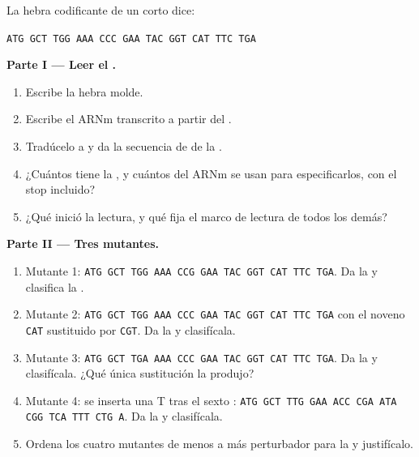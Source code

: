 \begin{problem}
\label{pb:g11:gene-expression:1}
La hebra codificante de un  corto dice:
\begin{center}
\texttt{ATG GCT TGG AAA CCC GAA TAC GGT CAT TTC TGA}
\end{center}

\medskip
\noindent\textbf{Parte I --- Leer el .}
\begin{enumerate}
  \item Escribe la hebra molde.
  \item Escribe el ARNm transcrito a partir del .
  \item Tradúcelo  a  y da la secuencia de  de la
        .
  \item ¿Cuántos  tiene la , y cuántos 
        del ARNm se usan para especificarlos, con el stop incluido?
  \item ¿Qué  inició la lectura, y qué fija el marco de lectura de
        todos los demás?
\end{enumerate}

\medskip
\noindent\textbf{Parte II --- Tres mutantes.}
\begin{enumerate}[resume]
  \item Mutante 1: \texttt{ATG GCT TGG AAA CCG GAA TAC GGT CAT TTC TGA}.
        Da la  y clasifica la .
  \item Mutante 2: \texttt{ATG GCT TGG AAA CCC GAA TAC GGT CAT TTC TGA}
        con el noveno  \texttt{CAT} sustituido por \texttt{CGT}.
        Da la  y clasifícala.
  \item Mutante 3: \texttt{ATG GCT TGA AAA CCC GAA TAC GGT CAT TTC TGA}.
        Da la  y clasifícala. ¿Qué única sustitución la
        produjo?
  \item Mutante 4: se inserta una T tras el sexto :
        \texttt{ATG GCT TTG GAA ACC CGA ATA CGG TCA TTT CTG A}. Da la
         y clasifícala.
  \item Ordena los cuatro mutantes de menos a más perturbador para la
         y justifícalo.
\end{enumerate}


\end{problem}
